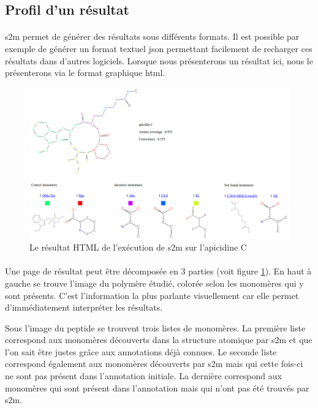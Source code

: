 \documentclass[12pt,french,twoside]{report}
\begin{document}
\subsection{Profil d'un résultat}

\paragraph{}s2m permet de générer des résultats sous différents formats.
Il est possible par exemple de générer un format textuel json permettant facilement de recharger ces résultats dans d'autres logiciels.
Lorsque nous présenterons un résultat ici, nous le présenterons via le format graphique html.

\begin{figure}[!h]
  \begin{center}
    \includegraphics[width=450px]{Figures/s2m/results/apicidinC.png}
    \caption{\label{s2m_HTML}Le résultat HTML de l'exécution de s2m sur l'apicidine C}
  \end{center}
\end{figure}

\paragraph{}Une page de résultat peut être décomposée en 3 parties (voit figure \ref{s2m_HTML}).
En haut à gauche se trouve l'image du polymère étudié, colorée selon les monomères qui y sont présents.
C'est l'information la plus parlante visuellement car elle permet d'immédiatement interpréter les résultats.

Sous l'image du peptide se trouvent trois listes de monomères.
La première liste correspond aux monomères découverts dans la structure atomique par s2m et que l'on sait être justes grâce aux annotations déjà connues.
Le seconde liste correspond également aux monomères découverts par s2m mais qui cette fois-ci ne sont pas présent dans l'annotation initiale.
La dernière correspond aux monomères qui sont présent dans l'annotation mais qui n'ont pas été trouvés par s2m.
\end{document}
